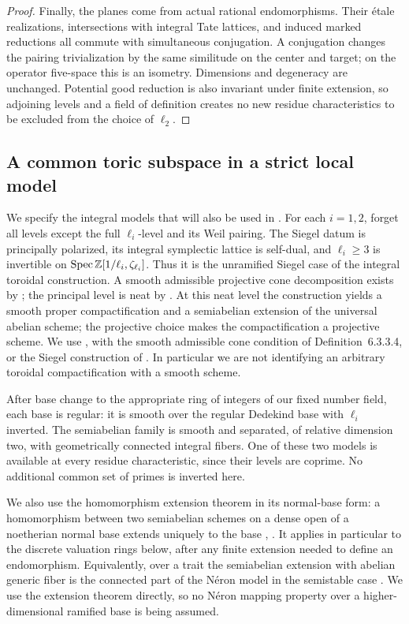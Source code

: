 \begin{proof}
Finally, the planes come from actual rational endomorphisms.  Their
\'etale realizations, intersections with integral Tate lattices,
and induced marked reductions all commute with simultaneous
conjugation.  A conjugation changes the pairing trivialization by the
same similitude on the center and target; on the operator five-space
this is an isometry.  Dimensions and degeneracy are unchanged.
Potential good reduction is also invariant under finite extension,
so adjoining levels and a field of definition creates no new residue
characteristics to be excluded from the choice of $\ell_2$.
\end{proof}

\subsection{A common toric subspace in a strict local model}

We specify the integral models that will also be used in
.  For each $i=1,2$, forget all levels except
the full $\ell_i$-level and its Weil pairing.  The Siegel datum is
principally polarized, its integral symplectic lattice is self-dual,
and $\ell_i\ge3$ is invertible on
$\operatorname{Spec}\mathbb Z[1/\ell_i,\zeta_{\ell_i}]$.  Thus it is the unramified
Siegel case of the integral toroidal construction.  A smooth admissible
projective cone decomposition exists by
\cite[Proposition~7.3.1.4]{Lan2013}; the principal level is neat by
\cite[Remark~1.4.1.9]{Lan2013}.  At this neat level the
construction yields a smooth proper compactification and a
semiabelian extension of the universal abelian scheme; the projective
choice makes the compactification a projective scheme.  We use
\cite[Theorems~6.4.1.1 and~7.3.3.4]{Lan2013}, with the smooth
admissible cone condition of Definition~6.3.3.4, or the Siegel
construction of \cite[Chapter~IV]{FaltingsChai1990}.
In particular we are not identifying an arbitrary toroidal
compactification with a smooth scheme.

After base change to the appropriate ring of integers of our fixed
number field, each base is regular: it is smooth over the regular
Dedekind base with $\ell_i$ inverted.  The semiabelian family is
smooth and separated, of relative dimension two, with geometrically
connected integral fibers.  One of these two models is available at
every residue characteristic, since their levels are coprime.  No
additional common set of primes is inverted here.

We also use the homomorphism extension theorem in its normal-base
form: a homomorphism between two semiabelian schemes on a dense open
of a noetherian normal base extends uniquely to the base
\cite[Chapter~I, Proposition~2.7]{FaltingsChai1990},
\cite[Proposition~3.3.1.5]{Lan2013}.  It applies in particular to
the discrete valuation rings below, after any finite extension needed
to define an endomorphism.  Equivalently, over a trait the semiabelian
extension with abelian generic fiber is the connected part of the
N\'eron model in the semistable case
\cite[\S7.4, Proposition~3 and Corollary~4]{BLR1990}.
We use the extension theorem
directly, so no N\'eron mapping property over a higher-dimensional
ramified base is being assumed.

